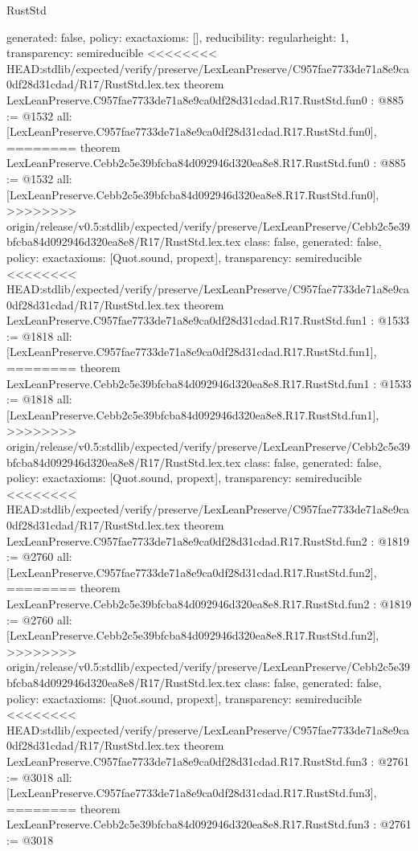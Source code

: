 \begin{lexlean}{RustStd}
\begin{coremodule}
{\begin{coremodule}
{{{  generated: false,
  policy: exact{axioms: []},
  reducibility: regular{height: 1},
  transparency: semireducible
}
<<<<<<<< HEAD:stdlib/expected/verify/preserve/LexLeanPreserve/C957fae7733de71a8e9ca0df28d31cdad/R17/RustStd.lex.tex
theorem LexLeanPreserve.C957fae7733de71a8e9ca0df28d31cdad.R17.RustStd.fun0 : @885 := @1532 {
  all: [LexLeanPreserve.C957fae7733de71a8e9ca0df28d31cdad.R17.RustStd.fun0],
========
theorem LexLeanPreserve.Cebb2c5e39bfcba84d092946d320ea8e8.R17.RustStd.fun0 : @885 := @1532 {
  all: [LexLeanPreserve.Cebb2c5e39bfcba84d092946d320ea8e8.R17.RustStd.fun0],
>>>>>>>> origin/release/v0.5:stdlib/expected/verify/preserve/LexLeanPreserve/Cebb2c5e39bfcba84d092946d320ea8e8/R17/RustStd.lex.tex
  class: false,
  generated: false,
  policy: exact{axioms: [Quot.sound, propext]},
  transparency: semireducible
}
<<<<<<<< HEAD:stdlib/expected/verify/preserve/LexLeanPreserve/C957fae7733de71a8e9ca0df28d31cdad/R17/RustStd.lex.tex
theorem LexLeanPreserve.C957fae7733de71a8e9ca0df28d31cdad.R17.RustStd.fun1 : @1533 := @1818 {
  all: [LexLeanPreserve.C957fae7733de71a8e9ca0df28d31cdad.R17.RustStd.fun1],
========
theorem LexLeanPreserve.Cebb2c5e39bfcba84d092946d320ea8e8.R17.RustStd.fun1 : @1533 := @1818 {
  all: [LexLeanPreserve.Cebb2c5e39bfcba84d092946d320ea8e8.R17.RustStd.fun1],
>>>>>>>> origin/release/v0.5:stdlib/expected/verify/preserve/LexLeanPreserve/Cebb2c5e39bfcba84d092946d320ea8e8/R17/RustStd.lex.tex
  class: false,
  generated: false,
  policy: exact{axioms: [Quot.sound, propext]},
  transparency: semireducible
}
<<<<<<<< HEAD:stdlib/expected/verify/preserve/LexLeanPreserve/C957fae7733de71a8e9ca0df28d31cdad/R17/RustStd.lex.tex
theorem LexLeanPreserve.C957fae7733de71a8e9ca0df28d31cdad.R17.RustStd.fun2 : @1819 := @2760 {
  all: [LexLeanPreserve.C957fae7733de71a8e9ca0df28d31cdad.R17.RustStd.fun2],
========
theorem LexLeanPreserve.Cebb2c5e39bfcba84d092946d320ea8e8.R17.RustStd.fun2 : @1819 := @2760 {
  all: [LexLeanPreserve.Cebb2c5e39bfcba84d092946d320ea8e8.R17.RustStd.fun2],
>>>>>>>> origin/release/v0.5:stdlib/expected/verify/preserve/LexLeanPreserve/Cebb2c5e39bfcba84d092946d320ea8e8/R17/RustStd.lex.tex
  class: false,
  generated: false,
  policy: exact{axioms: [Quot.sound, propext]},
  transparency: semireducible
}
<<<<<<<< HEAD:stdlib/expected/verify/preserve/LexLeanPreserve/C957fae7733de71a8e9ca0df28d31cdad/R17/RustStd.lex.tex
theorem LexLeanPreserve.C957fae7733de71a8e9ca0df28d31cdad.R17.RustStd.fun3 : @2761 := @3018 {
  all: [LexLeanPreserve.C957fae7733de71a8e9ca0df28d31cdad.R17.RustStd.fun3],
========
theorem LexLeanPreserve.Cebb2c5e39bfcba84d092946d320ea8e8.R17.RustStd.fun3 : @2761 := @3018 {
}}}}}}}
\end{coremodule}}
\end{coremodule}
\end{lexlean}
